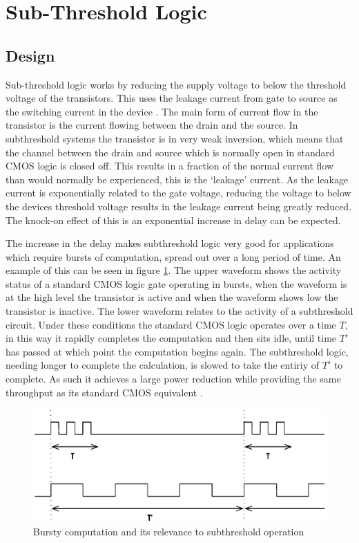 \section{Sub-Threshold Logic}
\label{sec:subthresh}

\subsection{Design}
Sub-threshold logic works by reducing the supply voltage to below the threshold voltage of the transistors.
This uses the leakage current from gate to source as the switching current in the device \cite{ULPSubThresh}.
The main form of current flow in the transistor is the current flowing between the drain and the source.
In subthreshold systems the transistor is in very weak inversion, which means that the channel between the drain and source which is normally open in standard CMOS logic is closed off.
This results in a fraction of the normal current flow than would normally be experienced, this is the `leakage' current.
As the leakage current is exponentially related to the gate voltage, reducing the voltage to below the devices threshold voltage results in the leakage current being greatly reduced.
The knock-on effect of this is an exponential increase in delay can be expected.

The increase in the delay makes subthreshold logic very good for applications which require bursts of computation, spread out over a long period of time.
An example of this can be seen in figure \ref{fig:burstST}.
The upper waveform shows the activity status of a standard CMOS logic gate operating in bursts, when the waveform is at the high level the transistor is active and when the waveform shows low the transistor is inactive.
The lower waveform relates to the activity of a subthreshold circuit.
Under these conditions the standard CMOS logic operates over a time $T$, in this way it rapidly completes the computation and then sits idle, until time $T'$ has passed at which point the computation begins again.
The subthreshold logic, needing longer to complete the calculation, is slowed to take the entiriy of $T'$ to complete.
As such it achieves a large power reduction while providing the same throughput as its standard CMOS equivalent \cite{IEEEVLSIRobustSTL,ULPSubThresh}.

\begin{figure}
	\centering
	\includegraphics[width=\columnwidth]{../../images/burstycomputation.png}
	\caption{Bursty computation and its relevance to subthreshold operation \cite{IEEEVLSIRobustSTL}}
	\label{fig:burstST}
\end{figure}

